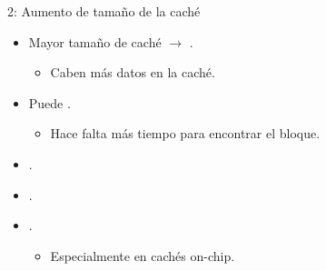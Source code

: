 \begin{frame}[t]{2: Aumento de tamaño de la caché}
\begin{itemize}
  \item Mayor tamaño de caché $\rightarrow$ .
    \begin{itemize}
      \item Caben más datos en la caché.
    \end{itemize}

  \item Puede .
    \begin{itemize}
      \item Hace falta más tiempo para encontrar el bloque.
    \end{itemize}

  \item {}.

  \item {}.

  \item {}.
    \begin{itemize}
      \item Especialmente en cachés on-chip.
    \end{itemize}
\end{itemize}
\end{frame}

